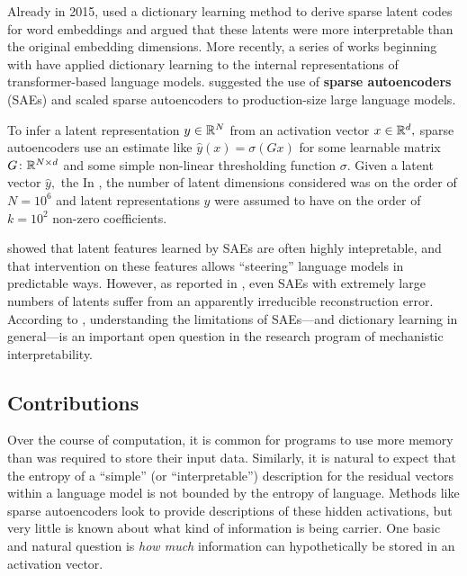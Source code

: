 Already in 2015, \cite{faruqui_sparse_2015} used a dictionary learning method to derive sparse latent codes for word embeddings and argued that these latents were more interpretable than the original embedding dimensions. More recently, a series of works beginning with \cite{yun_transformer_2021} have applied dictionary learning to the internal representations of transformer-based language models. \cite{cunningham_sparse_2023} suggested the use of \textbf{sparse autoencoders} (SAEs) and \cite{templeton_scaling_2024, gao_scaling_2024} scaled sparse autoencoders to production-size large language models.

To infer a latent representation $y \in \mathbb{R}^N$ from an activation vector $x \in \mathbb{R}^d,$ sparse autoencoders use an estimate like $\hat y(x) = \sigma(G x)$ for some learnable matrix $G \colon \mathbb{R}^{N \times d}$ and some simple non-linear thresholding function $\sigma.$ Given a latent vector $\hat y,$ the In \cite{gao_scaling_2024}, the number of latent dimensions considered was on the order of $N = 10^{6}$ and latent representations $y$ were assumed to have on the order of $k = 10^{2}$ non-zero coefficients.

\cite{templeton_scaling_2024} showed that latent features learned by SAEs are often highly intepretable, and that intervention on these features allows ``steering'' language models in predictable ways. However, as reported in \cite{gao_scaling_2024}, even SAEs with extremely large numbers of latents suffer from an apparently irreducible reconstruction error. According to \cite{sharkey_open_2025}, understanding the limitations of SAEs---and dictionary learning in general---is an important open question in the research program of mechanistic interpretability.

\subsection*{Contributions}

Over the course of computation, it is common for programs to use more memory than was required to store their input data. Similarly, it is natural to expect that the entropy of a ``simple'' (or ``interpretable'') description for the residual vectors within a language model is not bounded by the entropy of language. Methods like sparse autoencoders look to provide descriptions of these hidden activations, but very little is known about what kind of information is being carrier. One basic and natural question is \textit{how much} information can hypothetically be stored in an activation vector.

